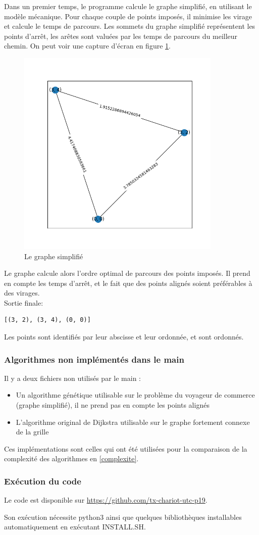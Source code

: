 Dans un premier temps, le programme calcule le graphe simplifié, en utilisant le modèle mécanique. Pour chaque couple de points imposés, il minimise les virage et calcule le temps de parcours. Les sommets du graphe simplifié représentent les points d'arrêt, les arêtes sont valuées par les temps de parcours du meilleur chemin. On peut voir une capture d'écran en figure \ref{fig:grapheSimp2}.
\begin{figure}
	\centering
	\includegraphics[height=10cm]{grapheSimp2.png}
	\caption{Le graphe simplifié}
	\label{fig:grapheSimp2}
\end{figure}
Le graphe calcule alors l'ordre optimal de parcours des points imposés. Il prend en compte les temps d'arrêt, et le fait que des points alignés soient préférables à des virages.\\
Sortie finale:
\begin{verbatim}
[(3, 2), (3, 4), (0, 0)]
\end{verbatim}
Les points sont identifiés par leur abscisse et leur ordonnée, et sont ordonnés.
\subsubsection*{Algorithmes non implémentés dans le main}
Il y a deux fichiers non utilisés par le main :
\begin{itemize}
	\item Un algorithme génétique utilisable sur le problème du voyageur de commerce (graphe simplifié), il ne prend pas en compte les points alignés
	\item L'algorithme original de Dijkstra utilisable sur le graphe fortement connexe de la grille
\end{itemize}
Ces implémentations sont celles qui ont été utilisées pour la comparaison de la complexité des algorithmes en \ref{complexite}.
\subsubsection{Exécution du code}
Le code est disponible sur \url{https://github.com/tx-chariot-utc-p19}.

Son exécution nécessite python3 ainsi que quelques bibliothèques installables automatiquement en exécutant INSTALL.SH.

